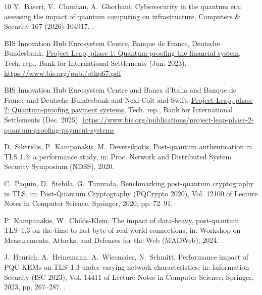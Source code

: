 \documentclass[preprint,12pt]{elsarticle}
\begin{document}
\begin{thebibliography}{10}
Y.~Baseri, V.~Chouhan, A.~Ghorbani, Cybersecurity in the quantum era: assessing
  the impact of quantum computing on infrastructure, Computers \& Security 167
  (2026) 104917.
\newblock \href {https://doi.org/10.1016/j.cose.2026.104917}
  {}.
  

{BIS Innovation Hub Eurosystem Centre, Banque de France, Deutsche Bundesbank},
  \href{https://www.bis.org/publ/othp67.pdf}{{Project Leap}, phase 1:
  Quantum-proofing the financial system}, Tech. rep., Bank for International
  Settlements (Jun. 2023).
\newline\urlprefix\url{https://www.bis.org/publ/othp67.pdf}

{BIS Innovation Hub Eurosystem Centre and Banca d'Italia and Banque de France
  and Deutsche Bundesbank and Nexi-Colt and Swift},
  \href{https://www.bis.org/publications/project-leap-phase-2-quantum-proofing-payment-systems}{{Project
  Leap}, phase 2: Quantum-proofing payment systems}, Tech. rep., Bank for
  International Settlements (Dec. 2025).
\newline\urlprefix\url{https://www.bis.org/publications/project-leap-phase-2-quantum-proofing-payment-systems}

D.~Sikeridis, P.~Kampanakis, M.~Devetsikiotis, Post-quantum authentication in
  {TLS} 1.3: a performance study, in: Proc. Network and Distributed System
  Security Symposium (NDSS), 2020.

C.~Paquin, D.~Stebila, G.~Tamvada, Benchmarking post-quantum cryptography in
  {TLS}, in: Post-Quantum Cryptography (PQCrypto 2020), Vol. 12100 of Lecture
  Notes in Computer Science, Springer, 2020, pp. 72--91.

P.~Kampanakis, W.~Childs-Klein, The impact of data-heavy, post-quantum {TLS}~1.3 on
  the time-to-last-byte of real-world connections, in: Workshop on Measurements,
  Attacks, and Defenses for the Web (MADWeb), 2024.
\newblock \href {https://doi.org/10.14722/madweb.2024.23010}
  {}.

J.~Henrich, A.~Heinemann, A.~Wiesmaier, N.~Schmitt, Performance impact of {PQC}
  {KEMs} on {TLS}~1.3 under varying network characteristics, in: Information
  Security (ISC 2023), Vol. 14411 of Lecture Notes in Computer Science,
  Springer, 2023, pp. 267--287.
\newblock \href {https://doi.org/10.1007/978-3-031-49187-0_14}
  {}.


\end{thebibliography}
\end{document}
